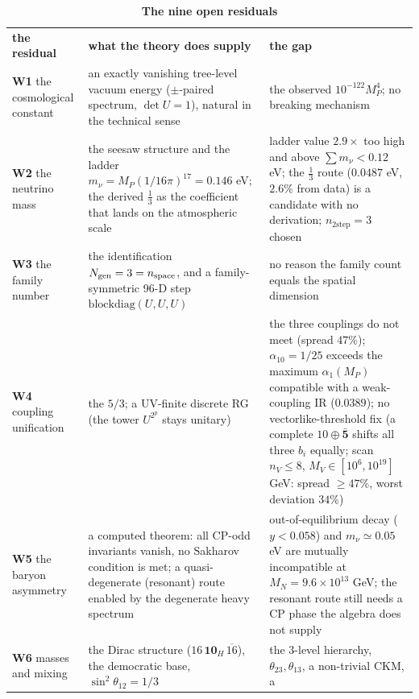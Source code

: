 \documentclass[aps,prd,twocolumn,amsmath,amssymb,superscriptaddress,nofootinbib,floatfix]{revtex4-2}
\newcommand{\grayhline}{\noalign{\vskip1pt{\color{black!30}\hrule height 0.3pt}\color{black}\vskip3pt}}
\begin{document}
\begin{table}[t]
\caption{\textbf{The nine open residuals}}
\label{tab:6}
\footnotesize
\begin{tabular}{@{}p{}p{}p{}@{}}
\toprule
\textbf{the residual} & \textbf{what the theory does supply} & \textbf{the gap} \\ \addlinespace[2pt] \midrule
\textbf{W1} the cosmological constant & an exactly vanishing tree-level vacuum energy (\(\pm\)-paired spectrum,
\(\det U = 1\)), natural in the technical sense & the observed \(10^{-122}M_P^4\); no breaking mechanism \\ \addlinespace[2pt]
\grayhline
\textbf{W2} the neutrino mass & the seesaw structure and the ladder
\(m_\nu = M_P(1/16\pi)^{17} = 0.146\) eV; the derived \(\tfrac13\) as
the coefficient that lands on the atmospheric scale & ladder value \(2.9\times\) too high and above \(\sum m_\nu < 0.12\) eV;
the \(\tfrac13\) route (\(0.0487\) eV, \(2.6\%\) from data) is a
candidate with no derivation; \(n_{2\text{step}} = 3\) chosen \\ \addlinespace[2pt]
\grayhline
\textbf{W3} the family number & the identification \(N_{\rm gen} = 3 = n_{\rm space}\), and a
family-symmetric 96-D step \(\mathrm{blockdiag}(U,U,U)\) & no reason the family count equals the spatial dimension \\ \addlinespace[2pt]
\grayhline
\textbf{W4} coupling unification & the \(5/3\); a UV-finite discrete RG (the tower \(U^{2^p}\) stays
unitary) & the three couplings do not meet (spread \(47\%\));
\(\alpha_{10} = 1/25\) exceeds the maximum \(\alpha_1(M_P)\) compatible
with a weak-coupling IR (\(0.0389\)); no vectorlike-threshold fix (a
complete \(10\oplus\bar{\mathbf 5}\) shifts all three \(b_i\) equally;
scan \(n_V \le 8\), \(M_V \in [10^6,10^{19}]\) GeV: spread \(\ge 47\%\),
worst deviation \(34\%\)) \\ \addlinespace[2pt]
\grayhline
\textbf{W5} the baryon asymmetry & a computed theorem: all CP-odd invariants vanish, no Sakharov condition
is met; a quasi-degenerate (resonant) route enabled by the degenerate
heavy spectrum & out-of-equilibrium decay (\(y < 0.058\)) and \(m_\nu \simeq 0.05\) eV
are mutually incompatible at \(M_N = 9.6\times10^{13}\) GeV; the
resonant route still needs a CP phase the algebra does not supply \\ \addlinespace[2pt]
\grayhline
\textbf{W6} masses and mixing & the Dirac structure (\(16\,\mathbf{10}_H\,\overline{16}\)), the
democratic base, \(\sin^2\theta_{12} = 1/3\) & the 3-level hierarchy, \(\theta_{23},\theta_{13}\), a non-trivial CKM, a

\end{tabular}
\end{table}
\end{document}

